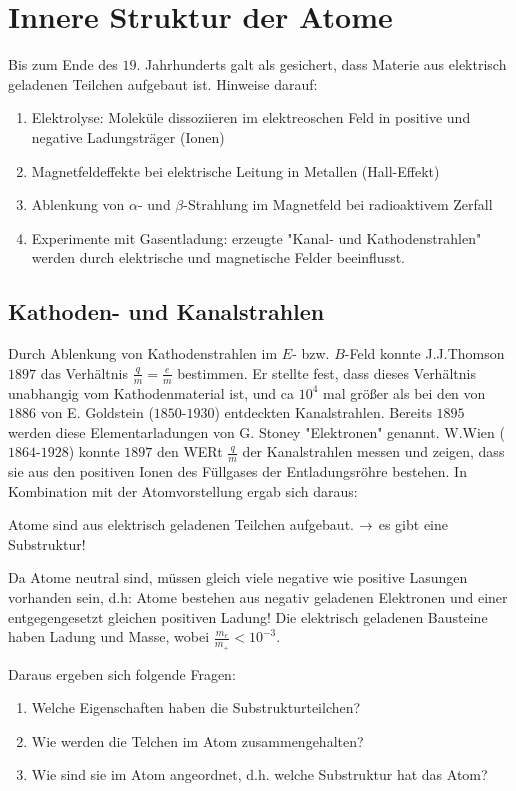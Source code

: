 \section{Innere Struktur der Atome} %
\label{sec:Innere_Struktur_der_Atome}

Bis zum Ende des $19.$ Jahrhunderts galt als gesichert, dass Materie aus
elektrisch geladenen Teilchen aufgebaut ist.
Hinweise darauf:
\begin{enumerate}
    \item Elektrolyse: Moleküle dissoziieren im elektreoschen Feld in positive
    und negative Ladungsträger (Ionen)
    \item Magnetfeldeffekte bei elektrische Leitung in Metallen (Hall-Effekt)
    \item Ablenkung von $\alpha$- und $\beta$-Strahlung im Magnetfeld bei
    radioaktivem Zerfall
    \item Experimente mit Gasentladung: erzeugte "Kanal- und Kathodenstrahlen"
    werden durch elektrische und magnetische Felder beeinflusst.
\end{enumerate}
\subsection{Kathoden- und Kanalstrahlen} %
\label{sub:Kathoden-_und_Kanalstrahlen}
Durch Ablenkung von Kathodenstrahlen im $E$- bzw. $B$-Feld konnte J.J.Thomson
$1897$ das Verhältnis $\frac{q}{m} = \frac{e}{m}$ bestimmen. Er stellte fest,
dass dieses Verhältnis unabhangig vom Kathodenmaterial ist, und ca $10^4$ mal
größer als bei den von $1886$ von E. Goldstein ($1850$-$1930$) entdeckten
Kanalstrahlen. Bereits $1895$ werden diese Elementarladungen von G. Stoney
"Elektronen" genannt.
W.Wien ($1864$-$1928$) konnte $1897$ den WERt $\frac{q}{m}$ der Kanalstrahlen
messen und zeigen, dass sie aus den positiven Ionen des Füllgases der
Entladungsröhre bestehen. In Kombination mit der Atomvorstellung ergab sich
daraus:

Atome sind aus elektrisch geladenen Teilchen aufgebaut. $\rightarrow$ es gibt eine
Substruktur!

Da Atome neutral sind, müssen gleich viele negative wie positive Lasungen
vorhanden sein, d.h:
Atome bestehen aus negativ geladenen Elektronen und einer
entgegengesetzt gleichen positiven Ladung!
Die elektrisch geladenen Bausteine haben Ladung und Masse, wobei
$\frac{m_e}{m_+} < 10^{-3}$.

Daraus ergeben sich folgende Fragen:
\begin{enumerate}
    \item Welche Eigenschaften haben die Substrukturteilchen?
    \item Wie werden die Telchen im Atom zusammengehalten?
    \item Wie sind sie im Atom angeordnet, d.h. welche Substruktur hat das
    Atom?
\end{enumerate}
